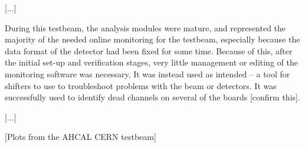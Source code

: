 [...]

During this testbeam, the analysis modules were mature, and represented the majority of the needed online monitoring for the testbeam, especially because the data format of the detector had been fixed for some time. Because of this, after the initial set-up and verification stages, very little management or editing of the monitoring software was necessary. It was instead used as intended -- a tool for shifters to use to troubleshoot problems with the beam or detectors. It was successfully used to identify dead channels on several of the boards [confirm this].

[...]

\begin{center}
	[Plots from the AHCAL CERN testbeam]
\end{center}

